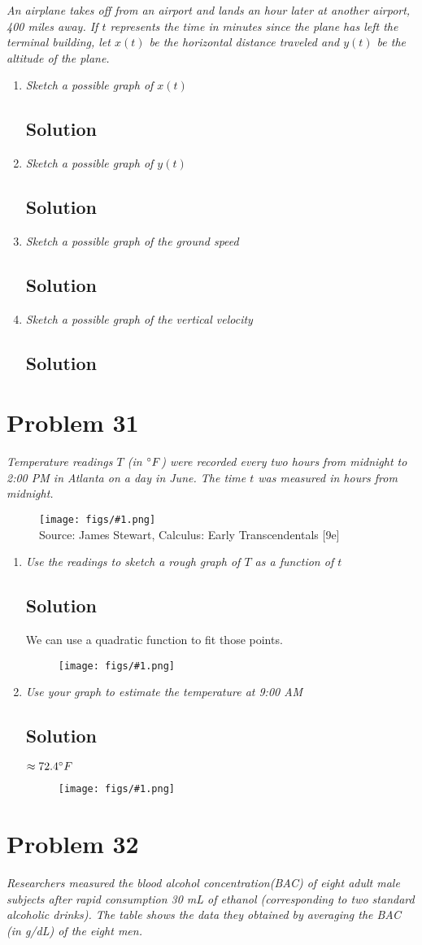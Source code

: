 \documentclass[11pt]{article}
\newcommand{\soln}{\subsection*}
\newcommand{\qn}{\textit}
\newcommand{\imagesource}[1]{{\footnotesize Source: #1}}
\newcommand{\imgqn}[1]{
	\begin{figure}[h]
		\centering
		\texttt{[image: figs/\#1.png]}\\
		\imagesource{James Stewart, Calculus: Early Transcendentals [9e]}
	\end{figure}
}
\newcommand{\imgsoln}[1]{
	\begin{figure}[h]
		\centering
		\texttt{[image: figs/\#1.png]}
	\end{figure}
}
\begin{document}
\qn{An airplane takes off from an airport and lands an hour later at another airport, 400 miles away. If $t$ represents the time in minutes since the plane has left the terminal building, let $x(t)$ be the horizontal distance traveled and $y(t)$ be the altitude of the plane.}

\begin{enumerate}
	\item \qn{Sketch a possible graph of $x(t)$}
	\soln{Solution}
	
	\item \qn{Sketch a possible graph of $y(t)$}
	\soln{Solution}
	
	\item \qn{Sketch a possible graph of the ground speed}
	\soln{Solution}
	
	\item \qn{Sketch a possible graph of the vertical velocity}
	\soln{Solution}
\end{enumerate}

\section*{Problem 31}

\qn{Temperature readings $T$ (in $\degree F$) were recorded every two hours from midnight to 2:00 PM in Atlanta on a day in June. The time $t$ was measured in hours from midnight.}

\imgqn{1.1.31}

\begin{enumerate}
	\item \qn{Use the readings to sketch a rough graph of $T$ as a function of $t$}
	\soln{Solution}
	We can use a quadratic function to fit those points.
	\imgsoln{1.1.31-ans.a}
	
	\item \qn{Use your graph to estimate the temperature at 9:00 AM}
	\soln{Solution}
	$\approx 72.4 \degree F$
	\imgsoln{1.1.31-ans.b}
\end{enumerate}

\section*{Problem 32}

\qn{Researchers measured the blood alcohol concentration(BAC) of eight adult male subjects after rapid consumption 30 mL of ethanol (corresponding to two standard alcoholic drinks). The table shows the data they obtained by averaging the BAC (in g/dL) of the eight men.}
\end{document}

